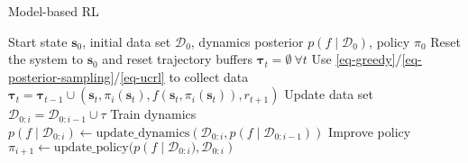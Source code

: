 \documentclass{article}
\newcommand{\state}{\ensuremath{\mathbf{s}}}
\newcommand{\action}{\ensuremath{\mathbf{a}}}
\newcommand{\dataset}{\ensuremath{\mathcal{D}}}
\newcommand{\transitionFn}{\ensuremath{f}}
\newcommand{\policy}{\ensuremath{\pi}}
\begin{document}
\begin{algorithm}[!b]
\caption{Model-based RL}\label{alg-mbrl}
\begin{algorithmic}[1]
  \Require Start state $\state_{0}$, initial data set $\dataset_{0}$, dynamics posterior $p(\transitionFn \mid \dataset_{0})$, policy $\policy_{0}$
    \State Reset the system to $\state_{0}$ and reset trajectory buffers $\bm\tau_{t} = \emptyset \ \forall t$
      \State Use \cref{eq-greedy}/\cref{eq-posterior-sampling}/\cref{eq-ucrl} to collect data $\bm\tau_{t} = \bm\tau_{t-1} \cup (\state_{t}, \policy_{i}(\state_{t}), \transitionFn(\state_{t}, \policy_{i}(\state_{t})), r_{t+1})$
    \EndFor
    \State Update data set $\dataset_{0:i} = \dataset_{0:i-1} \cup \tau$
    \State Train dynamics $p(\transitionFn \mid \dataset_{0:i}) \leftarrow \text{update\_dynamics}(\dataset_{0:i}, p(\transitionFn \mid \dataset_{0:i-1}))$
    \State Improve policy $\pi_{i+1} \leftarrow \text{update\_policy}(p\left(\transitionFn \mid \dataset_{0:i}), \dataset_{0:i} \right)$
\EndFor
\end{algorithmic}
\end{algorithm}
\end{document}
